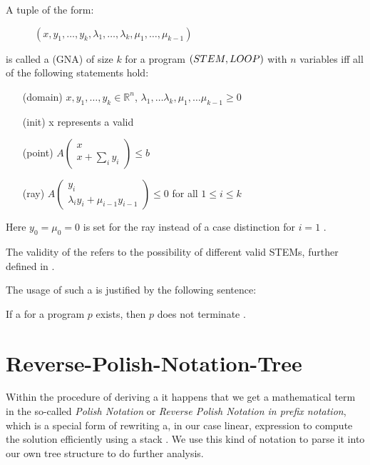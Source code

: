 \begin{definition}
	\label{def:gna}
	A tuple of the form:
	\begin{figure}[H]
		\centering
		$(x, y_1, \dots, y_k, \lambda_1, \dots, \lambda_k, \mu_1, \dots, \mu_{k-1})$
	\end{figure}  
	\vspace{-1em}
	is called a \gna (GNA) of size $k$ for a program $(STEM, LOOP)$ with $n$ variables iff all of the following statements hold:
	\begin{itemize}
		\setlength{\itemindent}{1in}
		\item[(domain)] $x, y_1, \dots, y_k \in \mathbb{R}^n$, $\lambda_1, \dots \lambda_k, \mu_1, \dots \mu_{k-1} \ge 0$
		\item[(init)] x represents a valid \stem
		\item[(point)] $A\begin{pmatrix} x \\ x + \sum_i y_i \end{pmatrix} \le b$
		\item[(ray)] $A\begin{pmatrix} y_i \\ \lambda_i y_i + \mu_{i-1} y_{i-1} \end{pmatrix} \le 0$ for all $1 \le i \le k$
	\end{itemize}
	Here $y_0 = \mu_0 = 0$ is set for the ray instead of a case distinction for $i=1$ \cite{leike2014geometric}.
\end{definition}
The validity of the \initc refers to the possibility of different valid STEMs, further defined in .

The usage of such a \gna is justified by the following sentence:
\begin{satz}
	\label{sen:gna-nonterm}
	If a \gna for a program $p$ exists, then $p$ does not terminate \cite{leike2014geometric}.
\end{satz}

\section{Reverse-Polish-Notation-Tree}
\label{sec:rpntree}
Within the procedure of deriving a \gna it happens that we get a mathematical term in the so-called \textit{Polish Notation} or \textit{Reverse Polish Notation in prefix notation}, which is a special form of rewriting a, in our case linear, expression to compute the solution efficiently using a stack \cite{wikirpn}. We use this kind of notation to parse it into our own tree structure to do further analysis.


